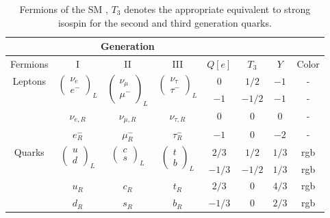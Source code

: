 \begin{table}[ht]
\caption{Fermions of the SM \cite{Davids}, $T_3$ denotes the appropriate equivalent to strong isospin for the second and third generation quarks.}
\begin{tabular}{|c||c|c|c|c|c|c|c|}
\cline{2-4}
\multicolumn{1}{c}{}& \multicolumn{3}{|c|}{Generation}& \multicolumn{4}{c}{}\\ \hline
Fermions & I & II & III & $Q[e]$ & $T_{3}$ & $Y$ & Color\\ \hline \hline
\multirow{4}{*}{Leptons} & \multirow{2}{*}{$\left(\begin{array}{c}\nu_{e}\\e^{-}\end{array}\right)_{L}$} & \multirow{2}{*}{$\left(\begin{array}{c}\nu_{\mu}\\ \mu^{-}\end{array}\right)_{L}$} & \multirow{2}{*}{$\left(\begin{array}{c}\nu_{\tau}\\ \tau^{-}\end{array}\right)_{L}$} & $0$ & $1/2$ & $-1$ & -\\\cline{5-8}
&  &  &  & $-1$ & $-1/2$ & $-1$ & -\\ \cline{5-8}
& $\nu_{e,R}$ & $\nu_{\mu,R}$ & $\nu_{\tau,R}$ & $0$ & $0$ & $0$ & -\\\cline{5-8}
& $e_{R}^{-}$ & $\mu_{R}^{-}$ & $\tau_{R}^{-}$ & $-1$ & $0$ & $-2$ & -\\ \hline
\multirow{4}{*}{Quarks} & \multirow{2}{*}{$\left(\begin{array}{c}u\\d\end{array}\right)_{L}$} & \multirow{2}{*}{$\left(\begin{array}{c}c\\s\end{array}\right)_{L}$} & \multirow{2}{*}{$\left(\begin{array}{c}t \\ b\end{array}\right)_{L}$} & $2/3$ & $1/2$ & $1/3$ & rgb\\\cline{5-8}
&  &  &  & $-1/3$ & $-1/2$ & $1/3$ & rgb\\ \cline{5-8}
& $u_{R}$ & $c_{R}$ & $t_{R}$ & $2/3$ & $0$ & $4/3$ & rgb\\\cline{5-8}
& $d_{R}$ & $s_{R}$ & $b_{R}$ & $-1/3$ & $0$ & $2/3$ & rgb\\ \hline
\end{tabular}
\centering
\label{tab_theo_sm_ferm}
\end{table}


